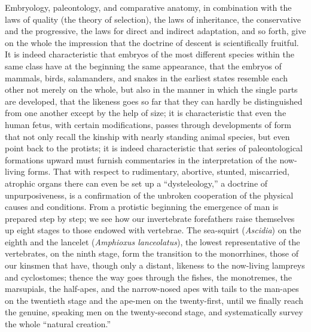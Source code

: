 \documentclass[12pt]{book}
\begin{document}
Embryology, paleontology, and comparative anatomy, in combination with the laws of quality
(the theory of selection), the laws of inheritance, the conservative and the progressive,
the laws for direct and indirect adaptation, and so forth, give on the whole the impression
that the doctrine of descent is scientifically fruitful. It is indeed characteristic that
embryos of the most different species within the same class have at the beginning the same
appearance, that the embryos of mammals, birds, salamanders, and snakes in the earliest
states resemble each other not merely on the whole, but also in the manner in which the
single parts are developed, that the likeness goes so far that they can hardly be
distinguished from one another except by the help of size; it is characteristic that even
the human fetus, with certain modifications, passes through developments of form that not
only recall the kinship with nearly standing animal species, but even point back to the
protists; it is indeed characteristic that series of paleontological formations upward must
furnish commentaries in the interpretation of the now-living forms. That with respect to
rudimentary, abortive, stunted, miscarried, atrophic organs there can even be set up a
``dysteleology,'' a doctrine of unpurposiveness, is a confirmation of the unbroken
cooperation of the physical causes and conditions. From a protistic beginning the emergence
of man is prepared step by step; we see how our invertebrate forefathers raise themselves up
eight stages to those endowed with vertebrae. The sea-squirt (\textit{Ascidia}) on the
eighth and the lancelet (\textit{Amphioxus lanceolatus}), the lowest representative of the
vertebrates, on the ninth stage, form the transition to the monorrhines, those of our
kinsmen that have, though only a distant, likeness to the now-living lampreys and
cyclostomes; thence the way goes through the fishes, the monotremes, the marsupials, the
half-apes, and the narrow-nosed apes with tails to the man-apes on the twentieth stage and
the ape-men on the twenty-first, until we finally reach the genuine, speaking men on the
twenty-second stage, and systematically survey the whole ``natural creation.''
\end{document}
